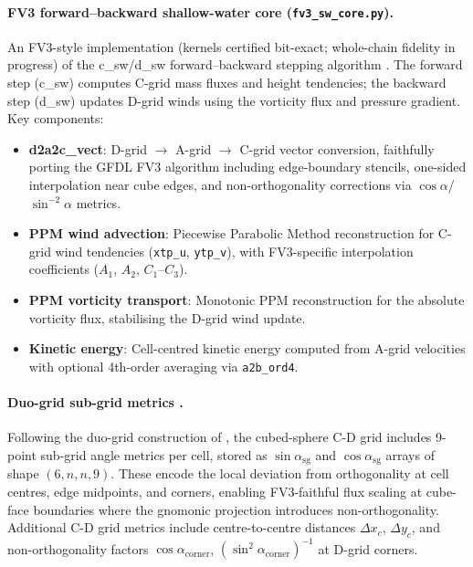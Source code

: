 \documentclass[11pt,a4paper]{article}
\begin{document}
\paragraph{FV3 forward--backward shallow-water core (\texttt{fv3\_sw\_core.py}).}
An FV3-style implementation (kernels certified bit-exact; whole-chain fidelity in progress) of the c\_sw/d\_sw forward--backward stepping algorithm \citep{Lin2004}.  The forward step (c\_sw) computes C-grid mass fluxes and height tendencies; the backward step (d\_sw) updates D-grid winds using the vorticity flux and pressure gradient.  Key components:
\begin{itemize}[nosep]
  \item \textbf{d2a2c\_vect}: D-grid $\to$ A-grid $\to$ C-grid vector conversion, faithfully porting the GFDL FV3 algorithm including edge-boundary stencils, one-sided interpolation near cube edges, and non-orthogonality corrections via $\cos\alpha$/$\sin^{-2}\!\alpha$ metrics.
  \item \textbf{PPM wind advection}: Piecewise Parabolic Method reconstruction for C-grid wind tendencies (\texttt{xtp\_u}, \texttt{ytp\_v}), with FV3-specific interpolation coefficients ($A_1$, $A_2$, $C_1$--$C_3$).
  \item \textbf{PPM vorticity transport}: Monotonic PPM reconstruction for the absolute vorticity flux, stabilising the D-grid wind update.
  \item \textbf{Kinetic energy}: Cell-centred kinetic energy computed from A-grid velocities with optional 4th-order averaging via \texttt{a2b\_ord4}.
\end{itemize}

\paragraph{Duo-grid sub-grid metrics \citep{Mouallem2023}.}
Following the duo-grid construction of \citet{Mouallem2023}, the cubed-sphere C-D grid includes 9-point sub-grid angle metrics per cell, stored as $\sin\alpha_{\mathrm{sg}}$ and $\cos\alpha_{\mathrm{sg}}$ arrays of shape $(6,n,n,9)$.  These encode the local deviation from orthogonality at cell centres, edge midpoints, and corners, enabling FV3-faithful flux scaling at cube-face boundaries where the gnomonic projection introduces non-orthogonality.  Additional C-D grid metrics include centre-to-centre distances $\Delta x_c$, $\Delta y_c$, and non-orthogonality factors $\cos\alpha_{\mathrm{corner}}$, $(\sin^2\!\alpha_{\mathrm{corner}})^{-1}$ at D-grid corners.
\end{document}
